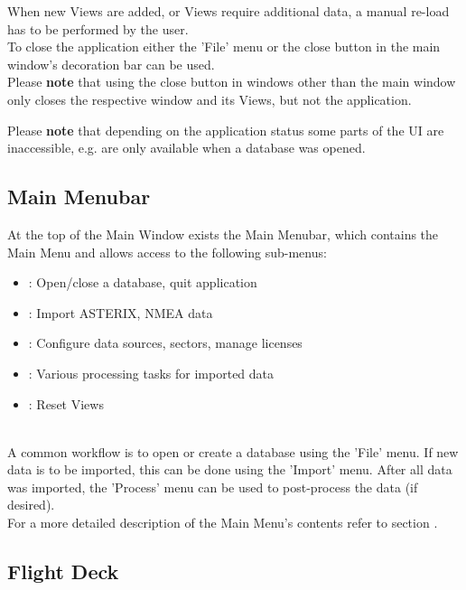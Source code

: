 When new Views are added, or Views require additional data, a manual re-load has to be performed by the user. \\

To close the application either the 'File' menu or the close button in the main window's decoration bar can be used. \\

Please \textbf{note} that using the close button in windows other than the main window only closes the respective window and its Views, but not the application.

Please \textbf{note} that depending on the application status some parts of the UI are inaccessible, e.g. are only available when a database was opened.

\subsection{Main Menubar}
\label{sec:ui_main_menu_bar}

At the top of the Main Window exists the Main Menubar, which contains the Main Menu and allows access to the following sub-menus: 

\begin{itemize}
 \item {}: Open/close a database, quit application
 \item {}: Import ASTERIX, NMEA data
 \item {}: Configure data sources, sectors, manage licenses
 \item {}: Various processing tasks for imported data
 \item {}: Reset Views
\end{itemize} 
\  \\

A common workflow is to open or create a database using the 'File' menu. If new data is to be imported, this can be done using the 'Import' menu. 
After all data was imported, the 'Process' menu can be used to post-process the data (if desired). \\

For a more detailed description of the Main Menu's contents refer to section .

\subsection{Flight Deck} 
\label{sec:ui_flight_deck}

